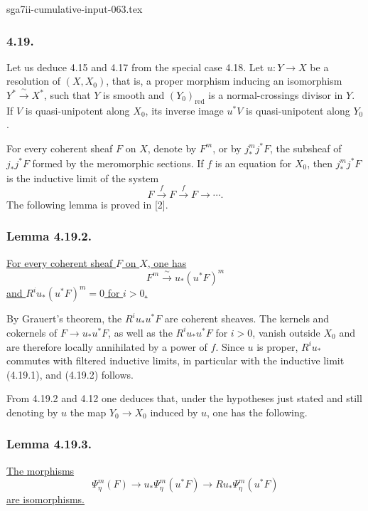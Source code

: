 \begin{filecontents*}{sga7ii-cumulative-input-063.tex}
\subsubsection*{4.19.}
Let us deduce 4.15 and 4.17 from the special case 4.18.  Let
$u:Y\longrightarrow X$ be a resolution of $(X,X_0)$, that is, a
proper morphism inducing an isomorphism
$Y^*\xrightarrow{\ \sim\ }X^*$, such that $Y$ is smooth and
$(Y_0)_{\mathrm{red}}$ is a normal-crossings divisor in $Y$.  If $V$
is quasi-unipotent along $X_0$, its inverse image $u^*V$ is
quasi-unipotent along $Y_0$.

For every coherent sheaf $F$ on $X$, denote by $F^m$, or by
$j_*^m j^*F$, the subsheaf of $j_*j^*F$ formed by the meromorphic
sections.  If $f$ is an equation for $X_0$, then $j_*^m j^*F$ is the
inductive limit of the system
\begin{equation}\tag{4.19.1}
F\xrightarrow{f}F\xrightarrow{f}F\longrightarrow\cdots.
\end{equation}
The following lemma is proved in [2].

\subsubsection*{Lemma 4.19.2.}
\underline{For every coherent sheaf $F$ on $X$, one has}
\[
F^m\xrightarrow{\ \sim\ }u_*(u^*F)^m
\]
\underline{and $R^iu_*(u^*F)^m=0$ for $i>0$.}

By Grauert's theorem, the $R^iu_*u^*F$ are coherent sheaves.  The
kernels and cokernels of $F\longrightarrow u_*u^*F$, as well as the
$R^iu_*u^*F$ for $i>0$, vanish outside $X_0$ and are therefore
locally annihilated by a power of $f$.  Since $u$ is proper,
$R^iu_*$ commutes with filtered inductive limits, in particular with
the inductive limit (4.19.1), and (4.19.2) follows.

From 4.19.2 and 4.12 one deduces that, under the hypotheses just
stated and still denoting by $u$ the map $Y_0\to X_0$ induced by
$u$, one has the following.

\subsubsection*{Lemma 4.19.3.}
\underline{The morphisms}
\[
\Psi_\eta^m(F)\longrightarrow
u_*\Psi_\eta^m(u^*F)\longrightarrow
Ru_*\Psi_\eta^m(u^*F)
\]
\underline{are isomorphisms.}


\end{filecontents*}
